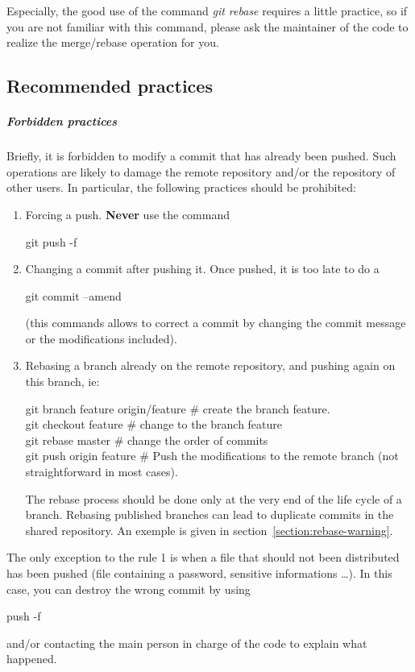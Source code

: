 Especially, the good use of the command \textit{git rebase} requires a little practice, 
so if you are not familiar with this command, 
please ask the maintainer of the code to realize the merge/rebase operation for you.

\subsection{Recommended practices}
\subparagraph{Forbidden practices}
Briefly, it is forbidden to modify a commit that has already been pushed. 
Such operations are likely to damage the remote repository and/or the repository of other users.
In particular, the following practices should be prohibited: 
\begin{enumerate}
\item Forcing a push. \textbf{Never} use the command \begin{tt}{git push -f}\end{tt}
\item Changing a commit after pushing it. Once pushed, it is too late to do a \begin{tt}{git commit --amend}\end{tt} (this commands allows to correct a commit by changing the commit message or the modifications included).
\item Rebasing a branch already on the remote repository, and pushing again on this branch, ie:\\
\begin{tt}
git branch feature origin/feature $\#$ create the branch feature.\\
git checkout feature		$\#$ change to the branch feature\\
git rebase master		$\#$ change the order of commits\\
git push origin feature  $\#$ Push the modifications to the remote branch (not straightforward in most cases).\\
\end{tt}
 
The rebase process should be done only at the very end of the life cycle of a branch.
Rebasing published branches can lead to duplicate commits in the shared repository. An exemple is given in section~\ref{section:rebase-warning}.
\end{enumerate}

The only exception to the rule 1 is when a file that should not been distributed has been pushed (file containing a password, sensitive informations \ldots).
In this case, you can destroy the wrong commit by using \begin{tt}push -f\end{tt} and/or contacting the main person in charge of the code to explain what happened.

